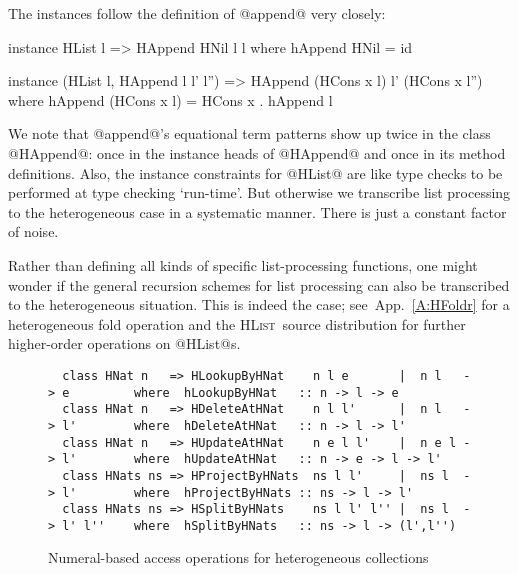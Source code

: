 \documentclass[nocopyrightspace,preprint]{sigplan-proc}
\newcommand{\hwVsTr}[2]{#2}
\newcommand{\HList}{\textsc{HList}}
\newenvironment{mybox}{%
\begin{boxedminipage}{\hsize}%
\medskip
}{%
\medskip
\end{boxedminipage}%
\medskip
}
\begin{document}
The instances follow the definition of @append@ very closely:

\begin{code}
 instance HList l => HAppend HNil l l
  where hAppend HNil = id
\end{code}

\begin{code}
 instance (HList l, HAppend l l' l'')
       => HAppend (HCons x l) l' (HCons x l'')
  where   hAppend (HCons x l) = HCons x . hAppend l
\end{code}

We note that @append@'s equational term patterns show up twice in the
class @HAppend@: once in the instance heads of @HAppend@ and once in
its method definitions. Also, the instance constraints for @HList@ are
like type checks to be performed at type checking `run-time'. But
otherwise we transcribe list processing to the heterogeneous case in a
systematic manner. There is just a constant factor of noise.

Rather than defining all kinds of specific list-processing functions,
one might wonder if the general recursion schemes for list processing
can also be transcribed to the heterogeneous situation. This is indeed
the case; see~\hwVsTr{\cite{HList}}{App.~\ref{A:HFoldr}} for a
heterogeneous fold operation and \hwVsTr{}{the \HList\ source
distribution for} further higher-order operations on @HList@s.






\begin{figure*}[t!]
\begin{mybox}

\vspace{-32\in}

{\small
\begin{verbatim}
  class HNat n   => HLookupByHNat    n l e       |  n l   -> e         where  hLookupByHNat   :: n -> l -> e
  class HNat n   => HDeleteAtHNat    n l l'      |  n l   -> l'        where  hDeleteAtHNat   :: n -> l -> l'
  class HNat n   => HUpdateAtHNat    n e l l'    |  n e l -> l'        where  hUpdateAtHNat   :: n -> e -> l -> l'
  class HNats ns => HProjectByHNats  ns l l'     |  ns l  -> l'        where  hProjectByHNats :: ns -> l -> l'
  class HNats ns => HSplitByHNats    ns l l' l'' |  ns l  -> l' l''    where  hSplitByHNats   :: ns -> l -> (l',l'')
\end{verbatim}
}

\vspace{-32\in}

\end{mybox}
\caption{Numeral-based access operations for heterogeneous collections}
\label{F:HArray}
\vspace{-32\in}
\end{figure*}
\end{document}
